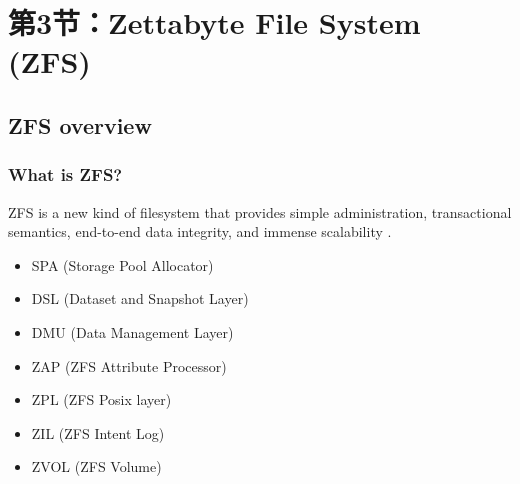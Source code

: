 \section{第3节：Zettabyte File System (ZFS)} %
\subsection{ZFS overview} %
\begin{frame}[fragile]
    \frametitle{What is ZFS?}
    ZFS is a new kind of filesystem that provides simple administration, transactional semantics, end-to-end data integrity, and immense scalability .

    \begin{itemize}
        \item SPA (Storage Pool Allocator)
        \item DSL (Dataset and Snapshot Layer)
        \item DMU (Data Management Layer)
        \item ZAP (ZFS Attribute Processor)
        \item ZPL (ZFS Posix layer)
        \item ZIL (ZFS Intent Log)
        \item ZVOL (ZFS Volume)
    \end{itemize}
\end{frame}
% 
% 
% 
% 
% 
